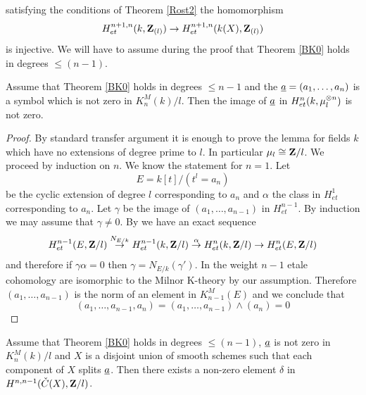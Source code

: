 \documentclass[11pt]{article}
\begin{document}
satisfying the conditions of Theorem \ref{Rost2} the homomorphism
%
$$H^{n+1,n}_{et}(k,{\bf Z\rm}_{(l)})\rightarrow H^{n+1,n}_{et}(k(X),{\bf Z\rm}_{(l)})$$
%
is injective. We will have to assume during the proof that Theorem
\ref{BK0} holds in degrees $\le (n-1)$.
\begin{lemma}
 Assume that Theorem \ref{BK0} holds in degrees $\le
n-1$ and the $\underline{a}=(a_1,\dots,a_n)$ is a symbol which is not zero in
$K_n^M(k)/l$. Then the image of $\underline{a}$ in $H^n_{et}(k,\mu_l^{\otimes
n})$ is not zero.
\end{lemma}
%
\begin{proof}
By standard transfer argument it is enough to prove the lemma for
fields $k$ which have no extensions of degree prime to $l$. In
particular $\mu_l\cong {\bf Z\rm}/l$.  We proceed by induction on $n$. We
know the statement for $n=1$. Let 
%
$$E=k[t]/(t^l=a_n)$$
%
be the cyclic extension of
degree $l$ corresponding to $a_n$ and $\alpha$ the class in
$H^{1}_{et}$ corresponding to $a_n$. Let $\gamma$ be the image of
$(a_1,\dots,a_{n-1})$ in $H^{n-1}_{et}$. By induction we may assume
that $\gamma\ne 0$. By \cite[Proposition 5.2]{MCpub} we have an exact
sequence
%
$$H^{n-1}_{et}(E,{\bf Z\rm}/l)\stackrel{N_{E/k}}{\rightarrow}
H^{n-1}_{et}(k,{\bf Z\rm}/l)\stackrel{\alpha}{\rightarrow}
H^{n}_{et}(k,{\bf Z\rm}/l)\rightarrow H^{n}_{et}(E,{\bf Z\rm}/l)$$
%
and therefore if $\gamma\alpha=0$ then $\gamma=N_{E/k}(\gamma')$. In
the weight $n-1$ etale cohomology are isomorphic to the Milnor
K-theory by our assumption. Therefore $(a_1,\dots,a_{n-1})$ is the
norm of an element in $K_{n-1}^M(E)$ and we conclude that 
%
$$(a_1,\dots,a_{n-1},a_n)=(a_1,\dots,a_{n-1})\wedge (a_n)=0$$
%
\end{proof}
\begin{lemma}
 Assume that Theorem \ref{BK0} holds in degrees $\le
(n-1)$, $\underline{a}$ is not zero in $K_n^M(k)/l$ and $X$ is a disjoint
union of smooth schemes such that each component of $X$ splits
$\underline{a}$. Then there exists a non-zero element $\delta$ in
$H^{n,n-1}(\check{C}(X),{\bf Z\rm}/l)$.
\end{lemma}
%
\end{document}
